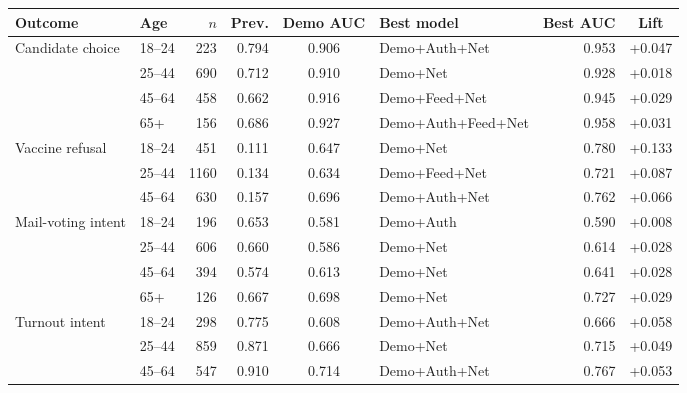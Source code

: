 \begin{tabular}{llrrclrc}
\toprule
Outcome & Age & $n$ & Prev. & Demo AUC & Best model & Best AUC & Lift \\
\midrule
Candidate choice & 18--24 & 223 & 0.794 & 0.906 & Demo+Auth+Net & 0.953 & +0.047 \\
 & 25--44 & 690 & 0.712 & 0.910 & Demo+Net & 0.928 & +0.018 \\
 & 45--64 & 458 & 0.662 & 0.916 & Demo+Feed+Net & 0.945 & +0.029 \\
 & 65+ & 156 & 0.686 & 0.927 & Demo+Auth+Feed+Net & 0.958 & +0.031 \\
Vaccine refusal & 18--24 & 451 & 0.111 & 0.647 & Demo+Net & 0.780 & +0.133 \\
 & 25--44 & 1160 & 0.134 & 0.634 & Demo+Feed+Net & 0.721 & +0.087 \\
 & 45--64 & 630 & 0.157 & 0.696 & Demo+Auth+Net & 0.762 & +0.066 \\
Mail-voting intent & 18--24 & 196 & 0.653 & 0.581 & Demo+Auth & 0.590 & +0.008 \\
 & 25--44 & 606 & 0.660 & 0.586 & Demo+Net & 0.614 & +0.028 \\
 & 45--64 & 394 & 0.574 & 0.613 & Demo+Net & 0.641 & +0.028 \\
 & 65+ & 126 & 0.667 & 0.698 & Demo+Net & 0.727 & +0.029 \\
Turnout intent & 18--24 & 298 & 0.775 & 0.608 & Demo+Auth+Net & 0.666 & +0.058 \\
 & 25--44 & 859 & 0.871 & 0.666 & Demo+Net & 0.715 & +0.049 \\
 & 45--64 & 547 & 0.910 & 0.714 & Demo+Auth+Net & 0.767 & +0.053 \\
\bottomrule
\end{tabular}